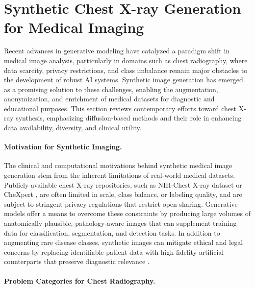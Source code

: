 \section{Synthetic Chest X-ray Generation for Medical Imaging}

Recent advances in generative modeling have catalyzed a paradigm shift in medical image analysis, particularly in domains such as chest radiography, where data scarcity, privacy restrictions, and class imbalance remain major obstacles to the development of robust AI systems. Synthetic image generation has emerged as a promising solution to these challenges, enabling the augmentation, anonymization, and enrichment of medical datasets for diagnostic and educational purposes. This section reviews contemporary efforts toward chest X-ray synthesis, emphasizing diffusion-based methods and their role in enhancing data availability, diversity, and clinical utility.

\paragraph{Motivation for Synthetic Imaging.}
The clinical and computational motivations behind synthetic medical image generation stem from the inherent limitations of real-world medical datasets. Publicly available chest X-ray repositories, such as NIH-Chest X-ray dataset \citep{wang2017chestxray8} or CheXpert \citep{Chexpert}, are often limited in scale, class balance, or labeling quality, and are subject to stringent privacy regulations that restrict open sharing. Generative models offer a means to overcome these constraints by producing large volumes of anatomically plausible, pathology-aware images that can supplement training data for classification, segmentation, and detection tasks. In addition to augmenting rare disease classes, synthetic images can mitigate ethical and legal concerns by replacing identifiable patient data with high-fidelity artificial counterparts that preserve diagnostic relevance \citep{generative_ai_medical_imaging_2025}.

\paragraph{Problem Categories for Chest Radiography.}


